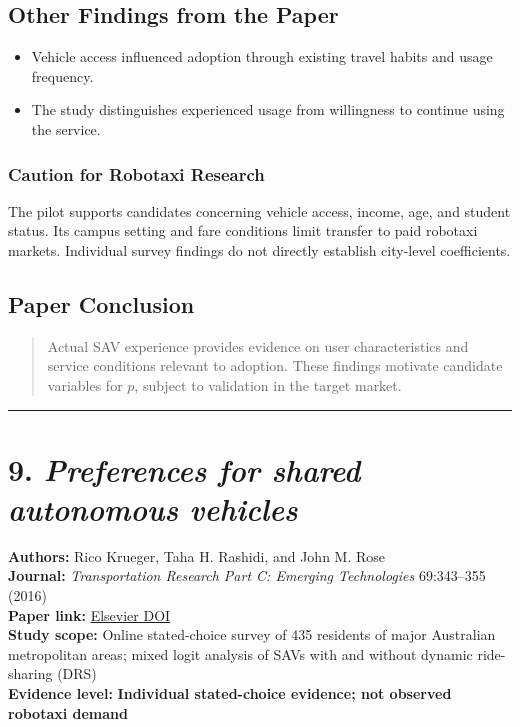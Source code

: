 \documentclass[10pt,a4paper]{article}
\providecommand{\tightlist}{\setlength{\itemsep}{0pt}\setlength{\parskip}{0pt}}
\begin{document}
\subsection{Other Findings from the Paper}

\begin{itemize}
\tightlist
\item
  Vehicle access influenced adoption through existing travel habits
  and usage frequency.
\item
  The study distinguishes experienced usage from willingness
  to continue using the service.
\end{itemize}

\subsubsection{Caution for Robotaxi Research}

The pilot supports candidates concerning vehicle access, income,
age, and student status.
Its campus setting and fare conditions limit transfer to paid robotaxi markets.
Individual survey findings do not directly establish city-level coefficients.

\subsection{Paper Conclusion}

\begin{quote}
Actual SAV experience provides evidence on user characteristics
and service conditions relevant to adoption.
These findings motivate candidate variables for $p$,
subject to validation in the target market.
\end{quote}


\begin{center}\rule{0.5\linewidth}{0.5pt}\end{center}

\hypertarget{preferences-for-shared-autonomous-vehicles}{%
\section{\texorpdfstring{9. \emph{Preferences for shared autonomous vehicles}}{9. Preferences for shared autonomous vehicles}}\label{preferences-for-shared-autonomous-vehicles}}

\textbf{Authors:} Rico Krueger, Taha H. Rashidi, and John M. Rose\\
\textbf{Journal:} \emph{Transportation Research Part C:
Emerging Technologies} 69:343--355 (2016)\\
\textbf{Paper link:}
\href{https://doi.org/10.1016/j.trc.2016.06.015}{Elsevier DOI}\\
\textbf{Study scope:} Online stated-choice survey of 435 residents
of major Australian metropolitan areas; mixed logit analysis
of SAVs with and without dynamic ride-sharing (DRS)\\
\textbf{Evidence level:}
\textbf{Individual stated-choice evidence;
not observed robotaxi demand}
\end{document}
